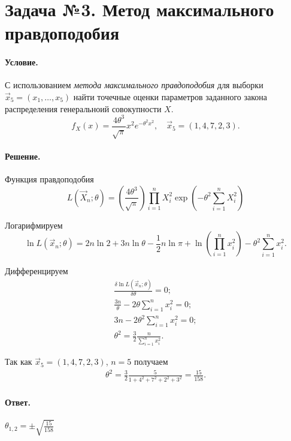 
\section{Задача №3. Метод максимального правдоподобия}

\paragraph{Условие.} С использованием \emph{метода максимального правдоподобия} для выборки $\vec{x}_5 = (x_1, \dots, x_5)$ найти точечные оценки параметров заданного закона распределения генеральноий совокупности $X$.
\[
    f_X(x) = \frac{4\theta^3}{\sqrt{\pi}} x^2 e^{-\theta^2 x^2}, \quad \vec{x}_5 = (1, 4, 7, 2, 3).
\]

\paragraph{Решение.}

\noindent
Функция правдоподобия
\[
    L(\vec{X}_n; \theta) = \left( \frac{4 \theta^3}{\sqrt{\pi}} \right) \prod_{i = 1}^{n} X_i^2 \exp \left( - \theta^2 \sum_{i = 1}^n X_i^2 \right)
\]

\noindent
Логарифмируем
\[
    \ln L(\vec{x}_n; \theta) = 2n \ln 2 + 3n \ln \theta - \frac{1}{2} n \ln\pi + \ln\left( \prod_{i = 1}^{n} x_i^2 \right) - \theta^2 \sum_{i = 1}^n x_i^2.
\]

\noindent
Дифференцируем
\begin{align*}
    \frac{\delta\ln L(\vec{x}_n; \theta)}{\delta\theta} = 0;
    \\
    \frac{3n}{\theta} - 2 \theta \sum_{i = 1}^n x_i^2 = 0;
    \\
    3n - 2\theta^2\sum_{i = 1}^n x_i^2 = 0;
    \\
    \theta^2 = \frac{3}{2}\frac{n}{\sum_{i = 1}^n x_i^2}.
\end{align*}

\noindent
Так как $\vec{x}_5 = (1, 4, 7, 2, 3)$, $n = 5$ получаем
\begin{align}
    \theta^2 = \frac{3}{2} \frac{5}{1 + 4^2 + 7^2 + 2^2 + 3^2} = \frac{15}{158}.
\end{align}

\paragraph{Ответ.} $\displaystyle\theta_{1, 2} = \pm \sqrt{\frac{15}{158}}$